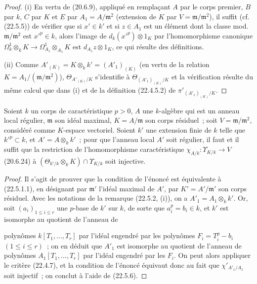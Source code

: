 \begin{proof}
(i) En vertu de (20.6.9), appliqué en remplaçant $A$ par le corps premier, $B$
par $k$, $C$ par $K$ et $E$ par $A_1=A/\mathfrak m^2$ (extension de $K$ par
$V=\mathfrak m/\mathfrak m^2$), il suffit (cf. (22.5.5)) de vérifier que si
$x'\in k'$ et si $z\in A_1$ est un élément dont la classe mod.
$\mathfrak m/\mathfrak m^2$ est $x'^p\in k$, alors l'image de
$d_k(x'^p)\otimes1_K$ par l'homomorphisme canonique
$\Omega^1_k\otimes_kK\longrightarrow\Omega^1_{A_1}\otimes_{A_1}K$ est
$d_{A_1}z\otimes1_K$, ce qui résulte des définitions.

(ii) Comme $A'_{(K)}=K\otimes_kk'=(A'_1)_{(K)}$ (en vertu de la relation
$K=A_1/(\mathfrak m/\mathfrak m^2)$), $\Theta_{A'_{(K)}/K}$ s'identifie à
$\Theta_{(A'_1)_{(K)}/K}$ et la vérification résulte du même calcul que dans
(i) et de la définition (22.4.5.2) de $\pi'_{(A'_1)_{(K)}/K}$.
\end{proof}

\begin{proposition}[22.5.7]
\label{0.22.5.7-fr}
Soient $k$ un corps de caractéristique $p>0$, $A$ une $k$-algèbre qui est un
anneau local régulier, $\mathfrak m$ son idéal maximal, $K=A/\mathfrak m$ son
corps résiduel~; soit $V=\mathfrak m/\mathfrak m^2$, considéré comme
$K$-espace vectoriel. Soient $k'$ une extension finie de $k$ telle que
$k'^p\subset k$, et $A'=A\otimes_kk'$~; pour que l'anneau local $A'$ soit
régulier, il faut et il suffit que la restriction de l'homomorphisme
caractéristique $\chi_{A/k}:\Upsilon_{K/k}\longrightarrow V$ (20.6.24) à
$(\Theta_{k'/k}\otimes_kK)\cap\Upsilon_{K/k}$ soit injective.
\end{proposition}

\begin{proof}
Il s'agit de prouver que la condition de l'énoncé est équivalente à
(22.5.1.1), en désignant par $\mathfrak m'$ l'idéal maximal de $A'$, par
$K'=A'/\mathfrak m'$ son corps résiduel. Avec les notations de la remarque
(22.5.2, (i)), on a $A'_1=A_1\otimes_kk'$. Or, soit
$(a_i)_{1\leqslant i\leqslant r}$ une $p$-base de $k'$ sur $k$, de sorte que
$a_i^p=b_i\in k$, et $k'$ est isomorphe au quotient de l'anneau de


polynômes $k[T_1,\ldots,T_r]$ par l'idéal engendré par les polynômes
$F_i=T_i^p-b_i$ $(1\leqslant i\leqslant r)$~; on en déduit que $A'_1$ est
isomorphe au quotient de l'anneau de polynômes $A_1[T_1,\ldots,T_r]$ par
l'idéal engendré par les $F_i$. On peut alors appliquer le critère (22.4.7), et
la condition de l'énoncé équivaut donc au fait que $\chi'_{A'_1/A_1}$ soit
injectif~; on conclut à l'aide de (22.5.6).
\end{proof}

